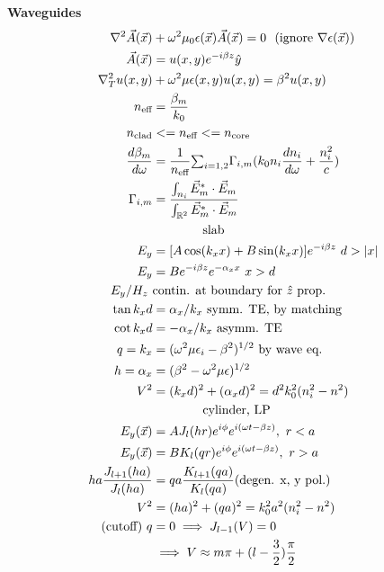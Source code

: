\documentclass[12pt]{article}
\begin{document}
\begin{multicols}{2}
\textbf{Waveguides}
\begin{align}
\nabla^2 \vec{A}(\vec{x}) &+ \omega^2 \mu_0 \epsilon(\vec{x}) \vec{A}(\vec{x}) = 0 \ \ (\textrm{ignore} \ \nabla\epsilon(\vec{x}))\\
\vec{A}(\vec{x}) &= u(x, y) e^{-i \beta z} \hat{y}\\
\nabla^2_T u(x, y) &+ \omega^2 \mu \epsilon(x, y) u(x, y) = \beta^2 u(x, y)\\
n_{\textrm{eff}} &= \frac{\beta_m}{k_0}\\
n_{\textrm{clad}} &<= n_{\textrm{eff}} <= n_{\textrm{core}}\\
\frac{d\beta_m}{d\omega} &= \frac{1}{n_{\textrm{eff}}} {\textstyle \sum_{i = 1, 2}} \Gamma_{i,m} (k_0 n_i \frac{dn_i}{d\omega} + \frac{n_i^2}{c})\\
\Gamma_{i,m} &= \frac{\int_{n_i} \vec{E}_{m}^* \cdot \vec{E}_{m}}{\int_{\mathbb{R}^2} \vec{E}_{m}^* \cdot \vec{E}_{m}}\\
& \qquad \qquad \textrm{slab}\\
E_{y} &= [A \cos(k_x x) + B \sin(k_x x)]e^{-i\beta z} \ d > \abs{x}\\
E_{y} &= B e^{-i \beta z} e^{- \alpha_x x} \ x > d\\
E_{y} / H_{z} \ &\textrm{contin. at boundary for} \ \hat{z} \ \textrm{prop.}\\
\tan{k_x d} &= \alpha_x / k_x \ \textrm{symm. TE, by matching}\\
\cot{k_x d} &= - \alpha_x / k_x \ \textrm{asymm. TE}\\
q = k_x &= (\omega^2 \mu \epsilon_i - \beta^2)^{1/2} \ \textrm{by wave eq.}\\
h = \alpha_x &= (\beta^2 - \omega^2 \mu \epsilon)^{1/2}\\
V^2 &= (k_x d)^2 + (\alpha_x d)^2 = d^2 k_0^2 (n_i^2 - n^2)\\
& \qquad \qquad \textrm{cylinder, LP}\\
E_y(\vec{x}) &= AJ_l(hr)e^{i\phi}e^{i(\omega t - \beta z)}, \ r < a\\
E_y(\vec{x}) &= BK_l(qr)e^{i\phi}e^{i(\omega t - \beta z)}, \ r > a\\
ha \frac{J_{l + 1}(ha)}{J_{l}(ha)} &= qa \frac{K_{l + 1}(qa)}{K_l(qa)} (\textrm{degen. x, y pol.})\\
V^2 &= (ha)^2 + (qa)^2 = k_0^2 a^2 (n_i^2 - n^2)\\
\textrm{(cutoff)} \ q &= 0 \implies J_{l - 1}(V) = 0\\
&\implies V \approx m\pi + (l - \frac{3}{2})\frac{\pi}{2}\\
\end{align}


\end{multicols}
\end{document}
